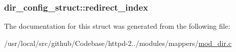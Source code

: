 \subsubsection[{\texorpdfstring{redirect\+\_\+index}{redirect_index}}]{ dir\+\_\+config\+\_\+struct\+::redirect\+\_\+index}\hypertarget{structdir__config__struct_a043c8568279a32404228f2a6754d5c1d}{}\label{structdir__config__struct_a043c8568279a32404228f2a6754d5c1d}


The documentation for this struct was generated from the following file\+:\begin{DoxyCompactItemize}
\item 
/usr/local/src/github/\+Codebase/httpd-\/2../modules/mappers/\hyperlink{mod__dir_8c}{mod\+\_\+dir.\+c}\end{DoxyCompactItemize}
